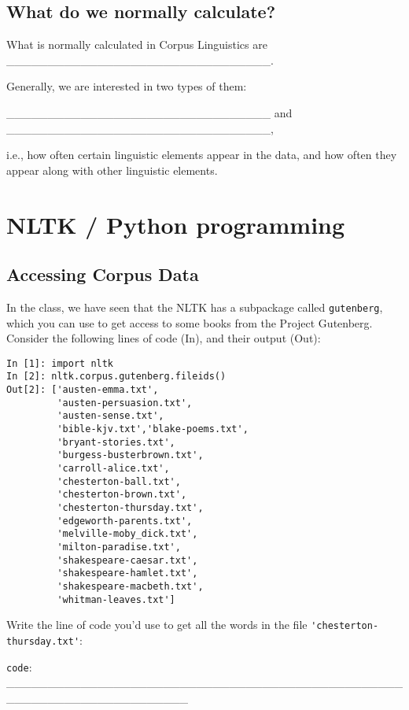 \documentclass[a4paper,11pt]{scrartcl}
\begin{document}
\subsection{What do we normally calculate?}

What is normally calculated in Corpus Linguistics are 
\_\_\_\_\_\_\_\_\_\_\_\_\_\_\_\_\_\_\_\_\_\_\_\_\_\_\_\_\_\_\_\_.

Generally, we are interested in two types of them: 


\_\_\_\_\_\_\_\_\_\_\_\_\_\_\_\_\_\_\_\_\_\_\_\_\_\_\_\_\_\_\_\_ and
\_\_\_\_\_\_\_\_\_\_\_\_\_\_\_\_\_\_\_\_\_\_\_\_\_\_\_\_\_\_\_\_,

i.e., how often certain linguistic elements appear in the data, and how
often they appear along with other linguistic elements.


\section{NLTK / Python programming}

\subsection{Accessing Corpus Data}

In the class, we have seen that the NLTK has a subpackage called
\verb|gutenberg|, which you can use to get access to some books from the
Project Gutenberg. Consider the following lines of code (In), and their
output (Out):

{\singlespacing
\begin{verbatim}
In [1]: import nltk
In [2]: nltk.corpus.gutenberg.fileids()
Out[2]: ['austen-emma.txt',
         'austen-persuasion.txt',
         'austen-sense.txt',
         'bible-kjv.txt','blake-poems.txt',
         'bryant-stories.txt',
         'burgess-busterbrown.txt',
         'carroll-alice.txt',
         'chesterton-ball.txt',
         'chesterton-brown.txt',
         'chesterton-thursday.txt',
         'edgeworth-parents.txt',
         'melville-moby_dick.txt',
         'milton-paradise.txt',
         'shakespeare-caesar.txt',
         'shakespeare-hamlet.txt',
         'shakespeare-macbeth.txt',
         'whitman-leaves.txt']
\end{verbatim}
}


Write the line of code you'd use to get all the words in the file \verb|'chesterton-thursday.txt'|:

\verb|code|: \_\_\_\_\_\_\_\_\_\_\_\_\_\_\_\_\_\_\_\_\_\_\_\_\_\_\_\_\_\_\_\_\_\_\_\_\_\_\_\_\_\_\_\_\_\_\_\_\_\_\_\_\_\_\_\_\_\_\_\_\_\_\_\_\_\_\_\_\_\_
  
\end{document}
